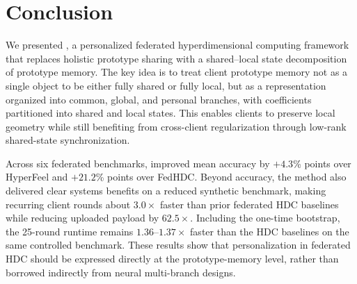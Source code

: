 \documentclass[lettersize,journal]{IEEEtran}
\newcommand{\rev}[1]{#1}
\begin{document}




\section{Conclusion}

We presented \Design, a personalized federated hyperdimensional computing framework that replaces holistic prototype sharing with a \rev{shared--local state decomposition of prototype memory}.
The key idea is to treat client prototype memory not as a single object to be either fully shared or fully \rev{local}, but as \rev{a representation organized into common, global, and personal branches, with coefficients partitioned into shared and local states}.
This enables clients to preserve local geometry while still benefiting from cross-client regularization through low-rank \rev{shared-state synchronization}.

Across \rev{six} federated benchmarks, \Design improved mean accuracy by $+4.3$\% points over HyperFeel and $+21.2$\% points over FedHDC.
Beyond accuracy, the method also delivered clear systems benefits on a reduced synthetic benchmark, making \rev{recurring} client rounds about $3.0\times$ faster than prior federated HDC baselines while reducing uploaded payload by $62.5\times$.
\rev{Including the one-time bootstrap, the 25-round runtime remains \(1.36\)--\(1.37\times\) faster than the HDC baselines on the same controlled benchmark.} These results show that personalization in federated HDC should be expressed directly at the prototype-memory level, rather than borrowed indirectly from neural multi-branch designs.

\end{document}
